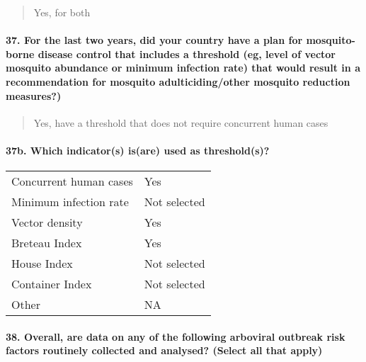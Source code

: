 \documentclass[
]{article}
\begin{document}
\begin{quote}
Yes, for both
\end{quote}

\hypertarget{for-the-last-two-years-did-your-country-have-a-plan-for-mosquito-borne-disease-control-that-includes-a-threshold-eg-level-of-vector-mosquito-abundance-or-minimum-infection-rate-that-would-result-in-a-recommendation-for-mosquito-adulticidingother-mosquito-reduction-measures}{%
\paragraph{37. For the last two years, did your country have a plan for
mosquito-borne disease control that includes a threshold (eg, level of
vector mosquito abundance or minimum infection rate) that would result
in a recommendation for mosquito adulticiding/other mosquito reduction
measures?)}\label{for-the-last-two-years-did-your-country-have-a-plan-for-mosquito-borne-disease-control-that-includes-a-threshold-eg-level-of-vector-mosquito-abundance-or-minimum-infection-rate-that-would-result-in-a-recommendation-for-mosquito-adulticidingother-mosquito-reduction-measures}}

\begin{quote}
Yes, have a threshold that does not require concurrent human cases
\end{quote}

\hypertarget{b.-which-indicators-isare-used-as-thresholds}{%
\paragraph{37b. Which indicator(s) is(are) used as
threshold(s)?}\label{b.-which-indicators-isare-used-as-thresholds}}

\begin{longtable}[]{@{}ll@{}}
\toprule
\endhead
Concurrent human cases & Yes \\
Minimum infection rate & Not selected \\
Vector density & Yes \\
Breteau Index & Yes \\
House Index & Not selected \\
Container Index & Not selected \\
Other & NA \\
\bottomrule
\end{longtable}

\hypertarget{overall-are-data-on-any-of-the-following-arboviral-outbreak-risk-factors-routinely-collected-and-analysed-select-all-that-apply}{%
\paragraph{38. Overall, are data on any of the following arboviral
outbreak risk factors routinely collected and analysed? (Select all that
apply)}\label{overall-are-data-on-any-of-the-following-arboviral-outbreak-risk-factors-routinely-collected-and-analysed-select-all-that-apply}}
\end{document}
